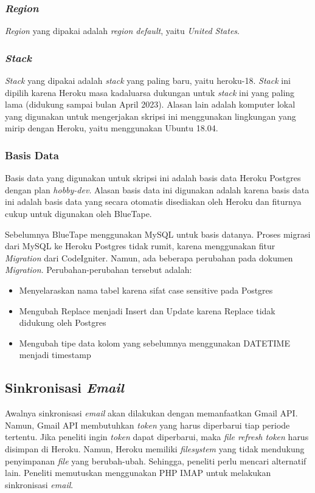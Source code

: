 	\subsubsection{\textit{Region}}
	\textit{Region} yang dipakai adalah \textit{region default}, yaitu \textit{United States}.
		
	\subsubsection{\textit{Stack}}
	\textit{Stack} yang dipakai adalah \textit{stack} yang paling baru, yaitu heroku-18. \textit{Stack} ini dipilih karena Heroku masa kadaluarsa dukungan untuk \textit{stack} ini yang paling lama (didukung sampai bulan April 2023). Alasan lain adalah komputer lokal yang digunakan untuk mengerjakan skripsi ini menggunakan lingkungan yang mirip dengan Heroku, yaitu menggunakan Ubuntu 18.04.

	\subsubsection{Basis Data}
		Basis data yang digunakan untuk skripsi ini adalah basis data Heroku Postgres dengan plan \textit{hobby-dev}. Alasan basis data ini digunakan adalah karena basis data ini adalah basis data yang secara otomatis disediakan oleh Heroku dan fiturnya cukup untuk digunakan oleh BlueTape.
	
		Sebelumnya BlueTape menggunakan MySQL untuk basis datanya. Proses migrasi dari MySQL ke Heroku Postgres tidak rumit, karena menggunakan fitur \textit{Migration} dari CodeIgniter. Namun, ada beberapa perubahan pada dokumen \textit{Migration}. Perubahan-perubahan tersebut adalah:
	\begin{itemize}
		\item Menyelaraskan nama tabel karena sifat case sensitive pada Postgres
		\item Mengubah Replace menjadi Insert dan Update karena Replace tidak didukung oleh Postgres
		\item Mengubah tipe data kolom yang sebelumnya menggunakan DATETIME menjadi timestamp
	\end{itemize}  

\subsection{Sinkronisasi \textit{Email}}
\label{sec:analisisemail}
	Awalnya sinkronisasi \textit{email} akan dilakukan dengan memanfaatkan Gmail API. Namun, Gmail API membutuhkan \textit{token} yang harus diperbarui tiap periode tertentu. Jika peneliti ingin \textit{token} dapat diperbarui, maka \textit{file refresh token} harus disimpan di Heroku. Namun, Heroku memiliki \textit{filesystem} yang tidak mendukung penyimpanan \textit{file} yang berubah-ubah. Sehingga, peneliti perlu mencari alternatif lain. Peneliti memutuskan menggunakan PHP IMAP untuk melakukan sinkronisasi \textit{email}.
	
